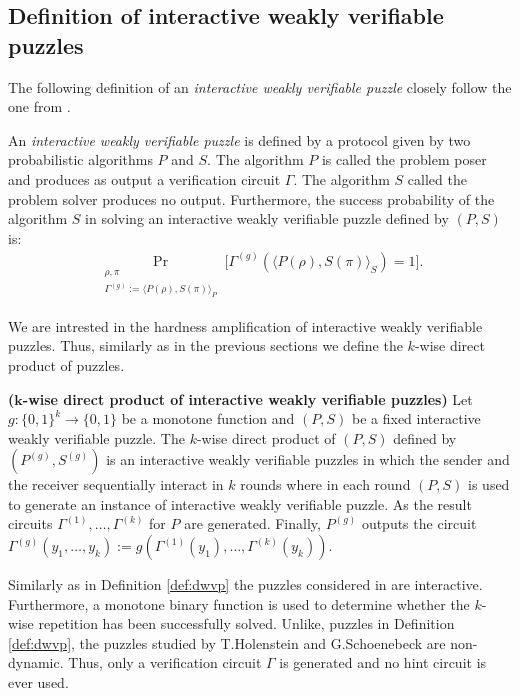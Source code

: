 \subsection{Definition of interactive weakly verifiable puzzles}
The following definition of an \textit{interactive weakly verifiable puzzle} closely follow the one from \cite{DBLP:journals/corr/abs-1002-3534}.
\begin{definition}
An \textit{interactive weakly verifiable puzzle} is defined by a protocol given by two probabilistic algorithms $P$ and $S$.
The algorithm $P$ is called the problem poser and produces as output a verification circuit $\Gamma$.
The algorithm $S$ called the problem solver produces no output.
Furthermore, the \textnormal{success probability} of the algorithm $S$ in solving an interactive weakly verifiable puzzle defined by $(P,S)$ is:
\begin{align*}
  \underset{\substack{\rho, \pi \\ \Gamma^{(g)} := \langle P(\rho), S(\pi) \rangle_{P}}}{\Pr}\Big[\Gamma^{(g)}(\langle P(\rho),S(\pi) \rangle_{S}) = 1 \Big].
\end{align*}
\end{definition}
We are intrested in the hardness amplification of interactive weakly verifiable puzzles. Thus, similarly as in the previous sections
we define the $k$-wise direct product of puzzles.
\begin{definition}\textbf{($\boldsymbol{k}$-wise direct product of interactive weakly verifiable puzzles)}
Let $g: \{0,1\}^{k} \rightarrow \{0,1\}$ be a monotone function and $(P,S)$ be a fixed interactive weakly verifiable puzzle.
The $k$-wise direct product of $(P,S)$ defined by $(P^{(g)}, S^{(g)})$ is an interactive weakly verifiable puzzles in which the sender and the receiver
sequentially interact in $k$ rounds where in each round $(P,S)$ is used to generate an instance of interactive weakly verifiable puzzle.
As the result circuits $\Gamma^{(1)}, \dotsc, \Gamma^{(k)}$ for $P$ are generated.
Finally, $P^{(g)}$ outputs the circuit $\Gamma^{(g)}(y_1, \dotsc, y_k) := g(\Gamma^{(1)}(y_1), \dotsc, \Gamma^{(k)}(y_k))$.
\end{definition}

Similarly as in Definition \ref{def:dwvp} the puzzles considered in \cite{DBLP:journals/corr/abs-1002-3534} are interactive.
Furthermore, a monotone binary function is used to determine whether the $k$-wise repetition
has been successfully solved. Unlike, puzzles in Definition \ref{def:dwvp}, the puzzles studied by T.Holenstein and G.Schoenebeck
are non-dynamic. Thus, only a verification circuit $\Gamma$ is generated and no hint circuit is ever used.

